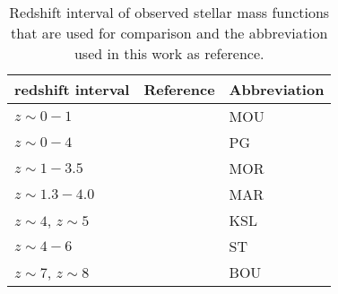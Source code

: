 \begin{table}
	\centering
	\caption{
		Redshift interval of observed stellar mass functions that are used for comparison and the abbreviation used in this work as reference.
		}
	\label{tab:obs_smf}
	\begin{tabular}[c]{l l l}
			redshift interval		& Reference						& 	Abbreviation \\
		\hline
			$z \sim 0 - 1 $			& \cite{OBS_moustakas}			& 	MOU	\\				
%
			$z \sim 0 - 4 $			& \cite{OBS_perez-gonzalez}		& 	PG \\			
%
			$z \sim 1 - 3.5 $		& \cite{OBS_mortlock}			& 	MOR	\\
%
			$z \sim 1.3 - 4.0$		& \cite{OBS_marchesini}			&   MAR  \\
%
			$z \sim 4$, $z \sim 5$	& \cite{OBS_kslee}				& 	KSL	\\
%
			$z \sim 4 - 6 $			& \cite{OBS_stark}				& 	ST	\\
%	
			$z \sim 7$, $z \sim 8$	& \cite{OBS_bouwens}			&	BOU	\\
	\end{tabular}
\end{table}